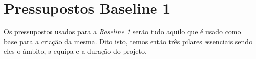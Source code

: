 \section{Pressupostos Baseline 1}

Os pressupostos usados para a \emph{Baseline 1} serão tudo aquilo que é usado como base para a criação da mesma. Dito isto, temos então três pilares essenciais sendo eles o âmbito, a equipa e a duração do projeto.



